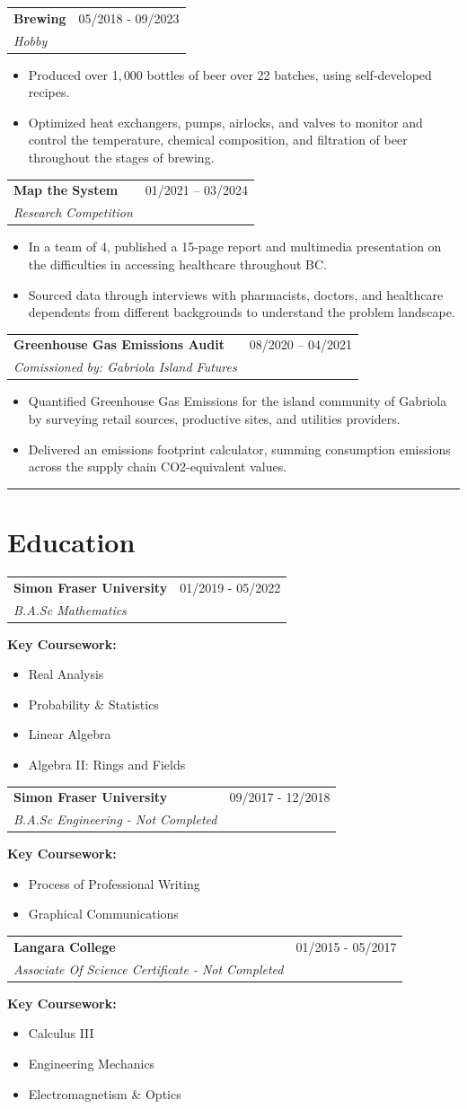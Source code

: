 \documentclass[a4paper,10pt]{article}
\makeatletter
\newcommand{\education}[4]{
	{
		\vspace{1.5mm}
		\noindent
		\begin{tabular*}{\textwidth}{@{\extracolsep{\fill}} l r}
			\textbf{#1} & #2 \\
			\textit{#3}
			\vspace{1.5mm}
		\end{tabular*}
		\vspace{-2mm}\hspace*{4mm}\textbf{Key Coursework:}
		\begin{itemize}
			\setlength{\itemsep}{-1mm}   %
			\setlength{\topsep}{0mm}
			\setlength{\parsep}{0mm}
			#4
		\end{itemize}
	}
}
\newcommand{\project}[4]{
	{
		\vspace{1.5mm}
		\noindent
		\begin{tabular*}{\textwidth}{@{\extracolsep{\fill}} l r}
			\textbf{#1} & #2 \\
			\textit{#3}
		\end{tabular*}
		\begin{itemize}
			\setlength{\itemsep}{-1mm}   %
			\setlength{\topsep}{0mm}
			\setlength{\parsep}{0mm}
			#4
		\end{itemize}
	}
}
\makeatother
\begin{document}
	\project
	{Brewing}
	{05/2018 - 09/2023}
	{Hobby}
	{
		\item Produced over 1$,$000 bottles of beer over 22 batches, using self-developed recipes.
		\item Optimized heat exchangers, pumps, airlocks, and valves to monitor and control the temperature, chemical composition, and filtration of beer throughout the stages of brewing.
	}
		
	\project
	{Map the System}
	{01/2021 – 03/2024}
	{Research Competition}
	{
		\item In a team of 4, published a 15-page report and multimedia presentation on the difficulties in accessing healthcare throughout BC.
		\item Sourced data through interviews with pharmacists, doctors, and healthcare dependents from different backgrounds to understand the problem landscape.	
	}
	
	\project
	{Greenhouse Gas Emissions Audit}
	{08/2020 – 04/2021}
	{Comissioned by: Gabriola Island Futures}
	{
		\item Quantified Greenhouse Gas Emissions for the island community of Gabriola by surveying retail sources, productive sites, and utilities providers.
		\item Delivered an emissions footprint calculator, summing consumption emissions across the supply chain CO2-equivalent values.
	}
	

\noindent\rule{\textwidth}{0.4pt}	
\section*{Education}
	
	\education
		{Simon Fraser University}
		{01/2019 - 05/2022}
		{B.A.Sc Mathematics}
		{
			\item Real Analysis
			\item Probability \& Statistics
			\item Linear Algebra
			\item Algebra II: Rings and Fields
		}
			
	\education
		{Simon Fraser University}
		{09/2017 - 12/2018}
		{B.A.Sc Engineering - Not Completed}
		{
			\item Process of Professional Writing
			\item Graphical Communications
		}
	
	\education
		{Langara College}
		{01/2015 - 05/2017}
		{Associate Of Science Certificate - Not Completed}
		{
			\item Calculus III
			\item Engineering Mechanics
			\item Electromagnetism \& Optics
		}
		
\end{document}

